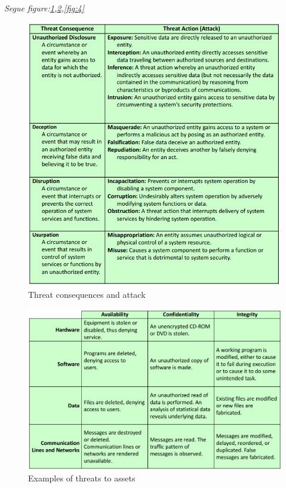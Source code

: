 \documentclass[12pt]{article}
\begin{document}
				 \textit{Segue figure:\ref{fig:2},\ref{fig:3},\ref{fig:4}}
				\begin{figure}[h!]
					\centering
					\includegraphics[scale=0.60]{img/threat.PNG}
					\caption{Threat consequences and attack\label{fig:2}}
				\end{figure}
				\begin{figure}[h!]
					\centering
					\includegraphics[scale=0.40]{img/asset.PNG}
					\caption{Examples	of	threats	to	assets\label{fig:3}}
				\end{figure}
\end{document}
